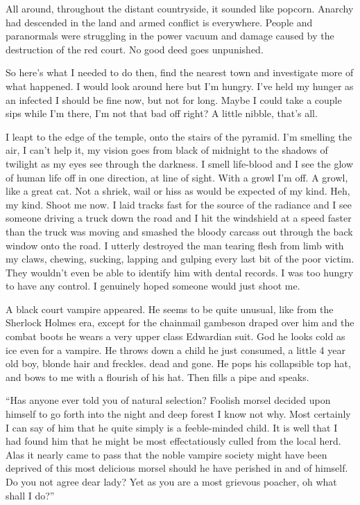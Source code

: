 All around, throughout the distant countryside, it sounded like popcorn. Anarchy had descended in the land and armed conflict is everywhere. People and paranormals were struggling in the power vacuum and damage caused by the destruction of the red court. No good deed goes unpunished.

So here's what I needed to do then, find the nearest town and investigate more of what happened. I would look around here but I'm hungry. I've held my hunger as an infected I should be fine now, but not for long. Maybe I could take a couple sips while I'm there, I'm not that bad off right? A little nibble, that's all.

I leapt to the edge of the temple, onto the stairs of the pyramid. I'm smelling the air, I can't help it, my vision goes from black of midnight to the shadows of twilight as my eyes see through the darkness. I smell life-blood and I see the glow of human life off in one direction, at line of sight. With a growl I'm off. A growl, like a great cat. Not a shriek, wail or hiss as would be expected of my kind. Heh, my kind. Shoot me now. I laid tracks fast for the source of the radiance and I see someone driving a truck down the road and I hit the windshield at a speed faster than the truck was moving and smashed the bloody carcass out through the back window onto the road. I utterly destroyed the man tearing flesh from limb with my claws, chewing, sucking, lapping and gulping every last bit of the poor victim. They wouldn't even be able to identify him with dental records. I was too hungry to have any control. I genuinely hoped someone would just shoot me.

A black court vampire appeared. He seems to be quite unusual, like from the Sherlock Holmes era, except for the chainmail gambeson draped over him and the combat boots he wears a very upper class Edwardian suit. God he looks cold as ice even for a vampire. He throws down a child he just consumed, a little 4 year old boy, blonde hair and freckles. dead and gone. He pops his collapsible top hat, and bows to me with a flourish of his hat. Then fills a pipe and speaks.

``Has anyone ever told you of natural selection? Foolish morsel decided upon himself to go forth into the night and deep forest I know not why. Most certainly I can say of him that he quite simply is a feeble-minded child. It is well that I had found him that he might be most effectatiously culled from the local herd. Alas it nearly came to pass that the noble vampire society might have been deprived of this most delicious morsel should he have perished in and of himself. Do you not agree dear lady? Yet as you are a most grievous poacher, oh what shall I do?''

